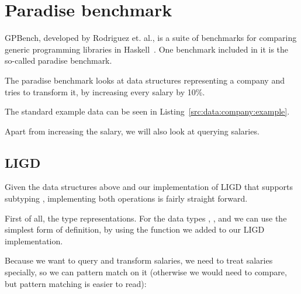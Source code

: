 \section{Paradise benchmark}
GPBench, developed by Rodriguez et. al., is a suite of benchmarks for comparing
generic programming libraries in Haskell~\cite{DBLP:conf/haskell/RodriguezJJGKO08}.
One benchmark included in it is the so-called paradise benchmark.

The paradise benchmark looks at data structures representing a company
and tries to transform it, by increasing every salary by 10\%.{}



The standard example data can be seen in Listing~\ref{src:data:company:example}.



Apart from increasing the salary, we will also look at querying salaries.


\subsection{LIGD}

Given the data structures above and our implementation of LIGD that supports
subtyping , implementing both operations is fairly straight forward.

First of all, the type representations. For the data types ,
, and  we can use the simplest form of definition,
by using the  function we added to our LIGD implementation.




Because we want to query and transform salaries, we need to treat salaries
specially, so we can pattern match on it (otherwise we would need to compare,
but pattern matching is easier to read):



